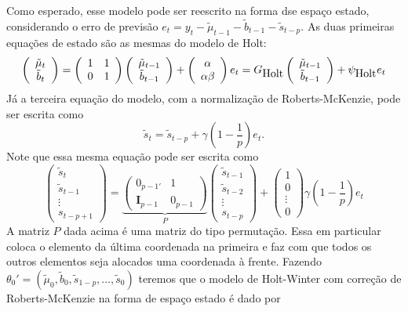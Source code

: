 \documentclass[
  letterpaper,
  DIV=11,
  numbers=noendperiod]{scrartcl}
\theoremstyle{plain}
\theoremstyle{plain}
\theoremstyle{definition}
\theoremstyle{definition}
\theoremstyle{remark}
\begin{document}
Como esperado, esse modelo pode ser reescrito na forma dse espaço
estado, considerando o erro de previsão
\(e_t=y_t-\tilde{\mu}_{t-1}-\tilde{b}_{t-1}-\tilde{s}_{t-p}\). As duas
primeiras equações de estado são as mesmas do modelo de Holt:
\[\left(\begin{array}{c} \tilde{\mu}_t \\ \tilde{b}_t\end{array}\right)=\left(\begin{array}{cc}1 & 1 \\ 0 & 1\end{array}\right)\left(\begin{array}{c} \tilde{\mu}_{t-1} \\ \tilde{b}_{t-1}\end{array}\right)+\left(\begin{array}{c} \alpha \\ \alpha\beta\end{array}\right)e_t=G_{\hbox{Holt}}\left(\begin{array}{c} \tilde{\mu}_{t-1} \\ \tilde{b}_{t-1}\end{array}\right)+\psi_{\hbox{Holt}}e_t\]
Já a terceira equação do modelo, com a normalização de Roberts-McKenzie,
pode ser escrita como
\[\tilde{s}_t=\tilde{s}_{t-p}+\gamma\left(1-\frac{1}{p}\right)e_t.\]
Note que essa mesma equação pode ser escrita como
\[\left(\begin{array}{c}\tilde{s}_t\\ \tilde{s}_{t-1} \\ \vdots \\ s_{t-p+1}\end{array}\right)=\underbrace{\left(\begin{array}{c} 0_{p-1'} & 1 \\ \textbf{I}_{p-1} & 0_{p-1} \end{array}\right)}_{P}\left(\begin{array}{c}\tilde{s}_{t-1}\\ \tilde{s}_{t-2} \\ \vdots \\ s_{t-p}\end{array}\right)+\left(\begin{array}{c}1\\ 0 \\ \vdots \\ 0\end{array}\right)\gamma\left(1-\frac{1}{p}\right) e_t\]
A matriz \(P\) dada acima é uma matriz do tipo permutação. Essa em
particular coloca o elemento da última coordenada na primeira e faz com
que todos os outros elementos seja alocados uma coordenada à frente.
Fazendo
\(\theta_0'=(\tilde{\mu}_0,\tilde{b}_0,\tilde{s}_{1-p},\ldots,\tilde{s}_0)\)
teremos que o modelo de Holt-Winter com correção de Roberts-McKenzie na
forma de espaço estado é dado por
\end{document}
